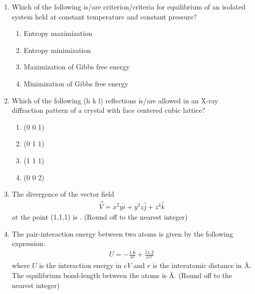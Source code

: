 \documentclass[journal]{IEEEtran}
\theoremstyle{remark}
\begin{document}
\begin{enumerate}[resume]
\item Which of the following is/are criterion/criteria for equilibrium of an isolated system held at constant temperature and constant pressure?   \hfill{}
\begin{enumerate}
\item Entropy maximization
\item Entropy minimization
\item Maximization of Gibbs free energy
\item Minimization of Gibbs free energy
\end{enumerate}

\item Which of the following (h k l) reflections is/are allowed in an X-ray diffraction pattern of a crystal with face centered cubic lattice?   \hfill{}
\begin{multicols}{4}
\begin{enumerate}
\item (0 0 1)
\item (0 1 1)
\item (1 1 1)
\item (0 0 2)
\end{enumerate}
\end{multicols}

\item The divergence of the vector field 
\begin{align}
\vec{V} = x^2y \hat{i} + y^3z \hat{j} + z^4 \hat{k}
\end{align}
at the point (1,1,1) is \underline{\hspace{2cm}}. (Round off to the nearest integer) \hfill{}

\item The pair-interaction energy between two atoms is given by the following expression:
\begin{align}
U = -\frac{1.6}{r^6} + \frac{51.2}{r^{12}}
\end{align}
where $U$ is the interaction energy in $eV$ and $r$ is the interatomic distance in Å. The equilibrium bond-length between the atoms is \underline{\hspace{2cm}} Å. (Round off to the nearest integer) \hfill{}


\end{enumerate}
\end{document}

